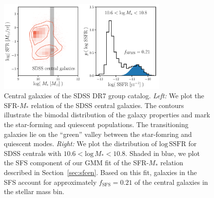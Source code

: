 \documentclass[12pt, letterpaper, preprint, tighten]{aastex}
\begin{document}
\begin{figure}
\begin{center}
\includegraphics[width=0.75\textwidth]{figs/groupcat.pdf}
    \caption{Central galaxies of the SDSS DR7 group catalog. \emph{Left:} We plot 
    the SFR-$M_*$ relation of the SDSS central galaxies. The contours illustrate the bimodal
    distribution of the galaxy properties and mark the star-forming and quiescent populations. 
    The transitioning galaxies lie on the ``green'' valley between the star-fomring and quiescent
    modes. %
    \emph{Right:} We plot the distribution of $\mathrm{log}\,\mathrm{SSFR}$ for SDSS centrals
    with $10.6 < \mathrm{log}\,M_* < 10.8$. Shaded in blue, we plot the SFS component of our 
    GMM fit of the SFR-$M_*$ relation described in Section~\ref{sec:sfcen}. Based on this fit, 
    galaxies in the SFS account for approximately $f_\mathrm{SFS} = 0.21$ of the central 
    galaxies in the stellar mass bin.} \label{fig:groupcat}
\end{center}
\end{figure}
\end{document}
